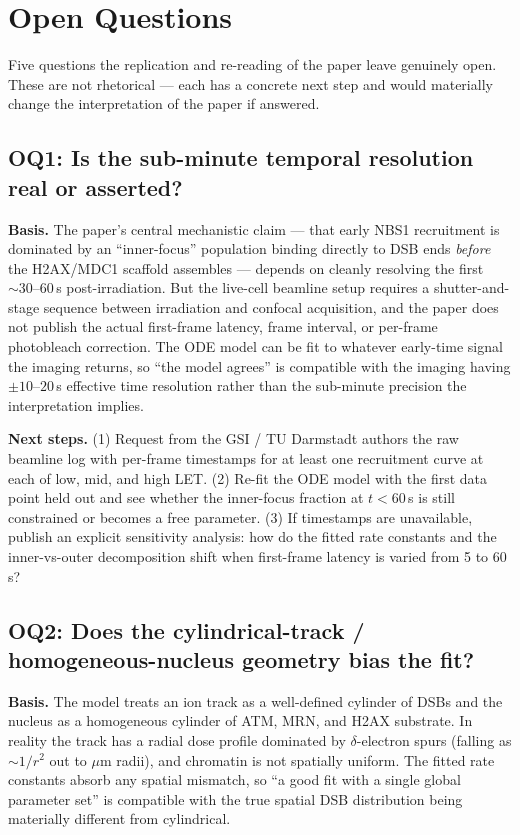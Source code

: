 \section{Open Questions}

Five questions the replication and re-reading of the paper leave genuinely open. These are
not rhetorical --- each has a concrete next step and would materially change the interpretation
of the paper if answered.

\subsection*{OQ1: Is the sub-minute temporal resolution real or asserted?}
\textbf{Basis.} The paper's central mechanistic claim --- that early NBS1 recruitment is
dominated by an ``inner-focus'' population binding directly to DSB ends \emph{before} the
H2AX/MDC1 scaffold assembles --- depends on cleanly resolving the first
$\sim 30\text{--}60$\,s post-irradiation. But the live-cell beamline setup requires a
shutter-and-stage sequence between irradiation and confocal acquisition, and the paper
does not publish the actual first-frame latency, frame interval, or per-frame photobleach
correction. The ODE model can be fit to whatever early-time signal the imaging returns,
so ``the model agrees'' is compatible with the imaging having $\pm 10\text{--}20$\,s
effective time resolution rather than the sub-minute precision the interpretation implies.

\textbf{Next steps.}
(1) Request from the GSI / TU Darmstadt authors the raw beamline log with per-frame timestamps
for at least one recruitment curve at each of low, mid, and high LET.
(2) Re-fit the ODE model with the first data point held out and see whether the inner-focus
fraction at $t<60$\,s is still constrained or becomes a free parameter.
(3) If timestamps are unavailable, publish an explicit sensitivity analysis: how do the fitted
rate constants and the inner-vs-outer decomposition shift when first-frame latency is varied
from 5 to 60\,s?

\subsection*{OQ2: Does the cylindrical-track / homogeneous-nucleus geometry bias the fit?}
\textbf{Basis.} The model treats an ion track as a well-defined cylinder of DSBs and the
nucleus as a homogeneous cylinder of ATM, MRN, and H2AX substrate. In reality the track has
a radial dose profile dominated by $\delta$-electron spurs (falling as $\sim 1/r^2$ out to
$\mu$m radii), and chromatin is not spatially uniform. The fitted rate constants absorb any
spatial mismatch, so ``a good fit with a single global parameter set'' is compatible with the
true spatial DSB distribution being materially different from cylindrical.

